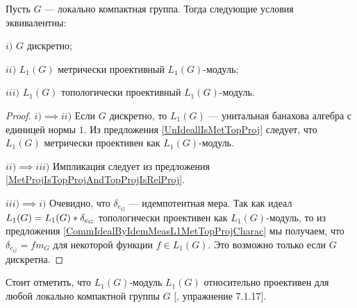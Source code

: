\begin{theorem}\label{L1ModL1MetTopProjCharac} Пусть $G$ --- локально компактная группа. Тогда следующие условия эквивалентны:

$i)$ $G$ дискретно;

$ii)$ $L_1(G)$ метрически проективный $L_1(G)$-модуль;

$iii)$ $L_1(G)$ топологически проективный $L_1(G)$-модуль.
\end{theorem}
\begin{proof} $i)$$\implies$$ ii)$ Если $G$ дискретно, то $L_1(G)$ --- унитальная банахова алгебра с единицей нормы $1$. Из предложения \ref{UnIdeallIsMetTopProj} следует, что $L_1(G)$ метрически проективен как $L_1(G)$-модуль.

$ii)$$\implies$$ iii)$ Импликация следует из предложения  \ref{MetProjIsTopProjAndTopProjIsRelProj}.

$iii)$$ \implies$$ i)$ Очевидно, что $\delta_{e_G}$ --- идемпотентная мера. Так как идеал $L_1(G)=L_1(G)\ast \delta_{e_G}$ топологически проективен как $L_1(G)$-модуль, то из предложения \ref{CommIdealByIdemMeasL1MetTopProjCharac} мы получаем, что $\delta_{e_G}=f m_G$ для некоторой функции $f\in L_1(G)$. Это возможно только если $G$ дискретна.
\end{proof}

Стоит отметить, что $L_1(G)$-модуль $L_1(G)$ относительно проективен для любой локально компактной группы $G$ [\cite{HelBanLocConvAlg}, упражнение 7.1.17].

